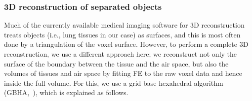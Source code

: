 \subsubsection{3D reconstruction of separated objects}
Much of the currently available medical imaging software for 3D reconstruction treats objects (i.e., lung tissues in our case) as surfaces, and this is most often done by a triangulation of the voxel surface. However, to perform a complete 3D reconstruction, we use a different approach here; we reconstruct not only the surface of the boundary between the tissue and the air space, but also the volumes of tissues and air space by fitting FE to the raw voxel data and hence inside the full volume. For this, we use a grid-base hexahedral algorithm (GBHA,~\cite{Schneiders1996}), which is explained as follows.

